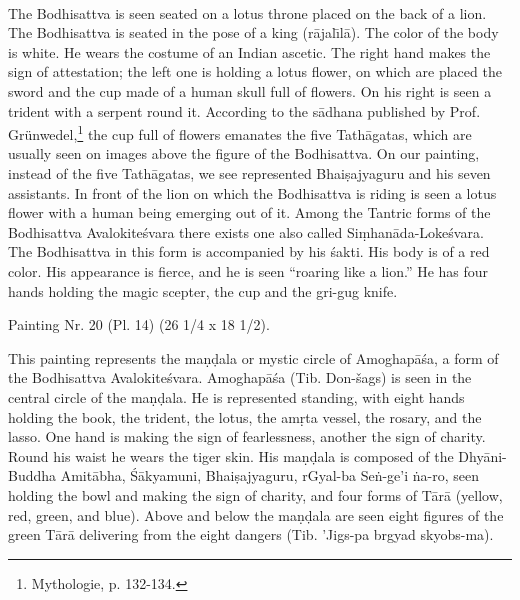 \documentclass[a4paper, 12pt, oneside]{article}
\begin{document}
\paragraph{}
The Bodhisattva is seen seated on a lotus throne placed on the back of a lion. The Bodhisattva is seated in the pose of a king (r\={a}jal\={\i}l\={a}). The color of the body is white. He wears the costume of an Indian ascetic. The right hand makes the sign of attestation; the left one is holding a lotus flower, on which are placed the sword and the cup made of a human skull full of flowers. On his right is seen a trident with a serpent round it. According to the s\={a}dhana published by Prof. Grünwedel,\footnote{Mythologie, p. 132-134.} the cup full of flowers emanates the five Tath\={a}gatas, which are usually seen on images above the figure of the Bodhisattva. On our painting, instead of the five Tath\={a}gatas, we see represented Bhai\d{s}ajyaguru and his seven assistants. In front of the lion on which the Bodhisattva is riding is seen a lotus flower with a human being emerging out of it. Among the Tantric forms of the Bodhisattva Avalokite\'{s}vara there exists one also called Si\d{m}han\={a}da-Loke\'{s}vara. The Bodhisattva in this form is accompanied by his \'{s}akti. His body is of a red color. His appearance is fierce, and he is seen ``roaring like a lion.'' He has four hands holding the magic scepter, the cup and the gri-gug knife.

\bigskip

Painting Nr. 20 (Pl. 14) (26 1/4 x 18 1/2).

\bigskip

This painting represents the ma\d{n}\d{d}ala or mystic circle of Amoghap\={a}\'{s}a, a form of the Bodhisattva Avalokite\'{s}vara. Amoghap\={a}\'{s}a (Tib. Don-šags) is seen in the central circle of the ma\d{n}\d{d}ala. He is represented standing, with eight hands holding the book, the trident, the lotus, the am\d{r}ta vessel, the rosary, and the lasso. One hand is making the sign of fearlessness, another the sign of charity. Round his waist he wears the tiger skin. His ma\d{n}\d{d}ala is composed of the Dhy\={a}ni-Buddha Amit\={a}bha, \'{S}\={a}kyamuni, Bhai\d{s}ajyaguru, rGyal-ba Se\.{n}-ge'i \.{n}a-ro, seen holding the bowl and making the sign of charity, and four forms of T\={a}r\={a} (yellow, red, green, and blue). Above and below the ma\d{n}\d{d}ala are seen eight figures of the green T\={a}r\={a} delivering from the eight dangers (Tib. 'Jigs-pa brgyad skyobs-ma).

\bigskip
\end{document}
